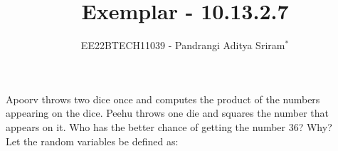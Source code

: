 \documentclass[journal,12pt,twocolumn]{IEEEtran}
\theoremstyle{remark}
\begin{document}

\vspace{3cm}

\title{Exemplar - 10.13.2.7}
\author{EE22BTECH11039 - Pandrangi Aditya Sriram$^{*}$%
}
\maketitle
\newpage
\bigskip

\renewcommand{\thefigure}{\theenumi}
\renewcommand{\thetable}{\theenumi}

Apoorv throws two dice once and computes the product of the numbers appearing
on the dice. Peehu throws one die and squares the number that appears on it. Who
has the better chance of getting the number 36? Why?\\\solution
Let the random variables be defined as:
\begin{table}[!ht]
	
\end{table}
\end{document}

